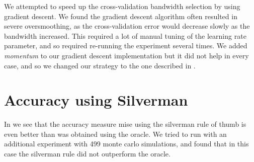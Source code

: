 We attempted to speed up the cross-validation bandwidth selection by using gradient descent.
We found the gradient descent algorithm often resulted in severe oversmoothing,
as the cross-validation error would decrease slowly as the bandwidth increased.
This required a lot of manual tuning of the learning rate parameter, and so required re-running the experiment several times.
We added \textit{momentum} to our gradient descent implementation but it did not help in every case, and so we changed our strategy to the one described in .

\section{Accuracy using Silverman}

In  we see that the accuracy measure \gls{mise} using the \gls{silverman} rule of thumb is even better than was obtained using the \gls{oracle}.
We tried to run with an additional experiment with 499 monte carlo simulations, and found that in this case the \gls{silverman} rule did not outperform the \gls{oracle}.

